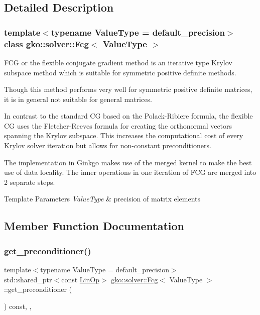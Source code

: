 \subsection{Detailed Description}
\subsubsection*{template$<$typename Value\+Type = default\+\_\+precision$>$\newline
class gko\+::solver\+::\+Fcg$<$ Value\+Type $>$}

F\+CG or the flexible conjugate gradient method is an iterative type Krylov subspace method which is suitable for symmetric positive definite methods. 

Though this method performs very well for symmetric positive definite matrices, it is in general not suitable for general matrices.

In contrast to the standard CG based on the Polack-\/\+Ribiere formula, the flexible CG uses the Fletcher-\/\+Reeves formula for creating the orthonormal vectors spanning the Krylov subspace. This increases the computational cost of every Krylov solver iteration but allows for non-\/constant preconditioners.

The implementation in Ginkgo makes use of the merged kernel to make the best use of data locality. The inner operations in one iteration of F\+CG are merged into 2 separate steps.


\begin{DoxyTemplParams}{Template Parameters}
{\em Value\+Type} & precision of matrix elements \\
\hline
\end{DoxyTemplParams}


\subsection{Member Function Documentation}
\mbox{\label{classgko_1_1solver_1_1Fcg_a2dec8d13548e8b316d6598c9ee8b0881}} 
\subsubsection{\texorpdfstring{get\+\_\+preconditioner()}{get\_preconditioner()}}
{\footnotesize\ttfamily template$<$typename Value\+Type  = default\+\_\+precision$>$ \\
std\+::shared\+\_\+ptr$<$const \hyperlink{classgko_1_1LinOp}{Lin\+Op}$>$ \hyperlink{classgko_1_1solver_1_1Fcg}{gko\+::solver\+::\+Fcg}$<$ Value\+Type $>$\+::get\+\_\+preconditioner (\begin{DoxyParamCaption}{ }\end{DoxyParamCaption}) const\hspace{0.3cm}{\ttfamily [inline]}, {\ttfamily [override]}, {\ttfamily [virtual]}}



